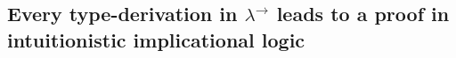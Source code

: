 \subsection{Every type-derivation in $ \lambda ^\to $ leads to a proof in intuitionistic implicational logic}
\label{sec:co_t2p}
